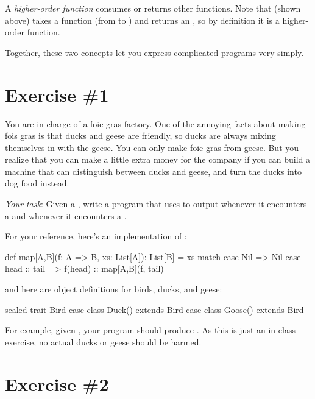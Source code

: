 \documentclass{book}
\begin{document}
A \emph{higher-order function} consumes or returns other functions.  Note that  (shown above) takes a function (from  to ) and returns an , so by definition it is a higher-order function.

Together, these two concepts let you express complicated programs very simply.

\section{Exercise \#1}

You are in charge of a foie gras factory.  One of the annoying facts about making fois gras is that ducks and geese are friendly, so ducks are always mixing themselves in with the geese.  You can only make foie gras from geese.  But you realize that you can make a little extra money for the company if you can build a machine that can distinguish between ducks and geese, and turn the ducks into dog food instead.

\emph{Your task}: Given a , write a program that uses  to output  whenever it encounters a  and  whenever it encounters a .

For your reference, here's an implementation of :

\begin{scalacode}
def map[A,B](f: A => B, xs: List[A]): List[B] = xs match {
  case Nil => Nil
  case head :: tail => f(head) :: map[A,B](f, tail)
}
\end{scalacode}

and here are object definitions for birds, ducks, and geese:

\begin{scalacode}
sealed trait Bird
case class Duck() extends Bird
case class Goose() extends Bird
\end{scalacode}

For example, given , your program should produce .  As this is just an in-class exercise, no actual ducks or geese should be harmed.

\section{Exercise \#2}
\end{document}
